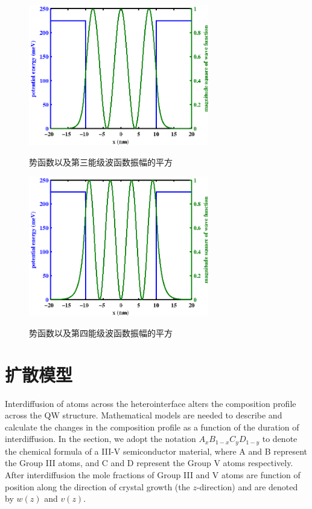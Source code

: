 \documentclass{ZJUthesis}
\begin{document}
\begin{figure}[!htb]
  \centering
  \includegraphics[width=0.7\textwidth]{./Pictures/wave3.eps}\\
  \caption{势函数以及第三能级波函数振幅的平方}
  \label{fig_wave3}
\end{figure}

\begin{figure}[!htb]
  \centering
  \includegraphics[width=0.7\textwidth]{./Pictures/wave4.eps}\\
  \caption{势函数以及第四能级波函数振幅的平方}
  \label{fig_wave4}
\end{figure}

\section{扩散模型}

Interdiffusion of atoms across the heterointerface alters the composition profile across the QW structure. Mathematical models are needed to describe and calculate the changes in the composition profile as a function of the duration of interdiffusion. In the section, we adopt the notation $A_{x}B_{1-x}C_{y}D_{1-y}$ to denote the chemical formula of a III-V semiconductor material, where A and B represent the Group III atoms, and C and D represent the Group V atoms respectively. After interdiffusion the mole fractions of Group III and V atoms are function of position along the direction of crystal growth (the $z$-direction) and are denoted by $w(z)$ and $v(z)$.
\end{document}
